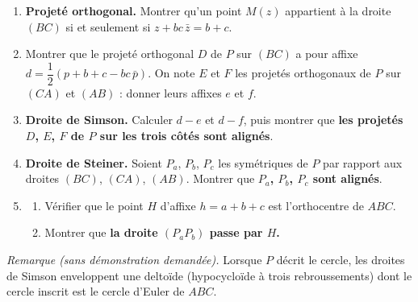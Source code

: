 \begin{enumerate}
  \item \textbf{Projeté orthogonal.} Montrer qu'un point $M(z)$ appartient à la droite $(BC)$ si et seulement si $z+bc\,\bar z=b+c$.
  \item Montrer que le projeté orthogonal $D$ de $P$ sur $(BC)$ a pour affixe $d=\dfrac12\left(p+b+c-bc\,\bar p\right)$. On note $E$ et $F$ les projetés orthogonaux de $P$ sur $(CA)$ et $(AB)$ : donner leurs affixes $e$ et $f$.
  \item \textbf{Droite de Simson.} Calculer $d-e$ et $d-f$, puis montrer que \textbf{les projetés $D$, $E$, $F$ de $P$ sur les trois côtés sont alignés}.
  \item \textbf{Droite de Steiner.} Soient $P_a$, $P_b$, $P_c$ les symétriques de $P$ par rapport aux droites $(BC)$, $(CA)$, $(AB)$. Montrer que \textbf{$P_a$, $P_b$, $P_c$ sont alignés}.
  \item
  \begin{enumerate}
    \item Vérifier que le point $H$ d'affixe $h=a+b+c$ est l'orthocentre de $ABC$.
    \item Montrer que \textbf{la droite $(P_aP_b)$ passe par $H$.}
  \end{enumerate}
\end{enumerate}

\emph{Remarque (sans démonstration demandée).} Lorsque $P$ décrit le cercle, les droites de Simson enveloppent une deltoïde (hypocycloïde à trois rebroussements) dont le cercle inscrit est le cercle d'Euler de $ABC$.

